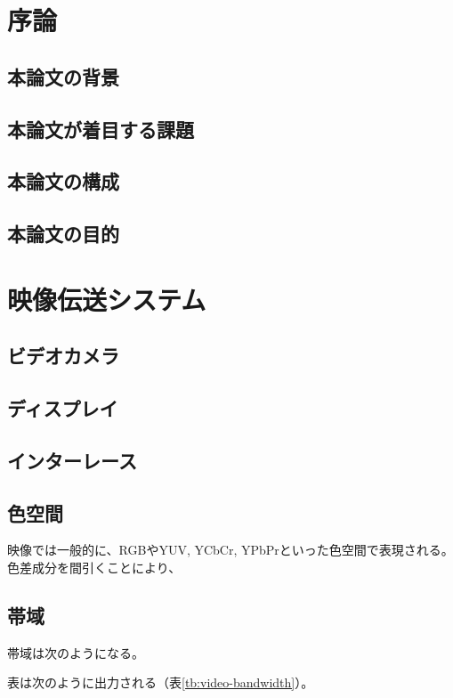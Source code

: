 \chapter{序論}
\label{chap:introduction}
\section{本論文の背景}
\section{本論文が着目する課題}
\section{本論文の構成}
\section{本論文の目的}

\chapter{映像伝送システム}
\label{chap:video-transmission}
\section{ビデオカメラ}
\section{ディスプレイ}
\section{インターレース}
\section{色空間}

映像では一般的に、RGBやYUV, YCbCr, YPbPrといった色空間で表現される。
色差成分を間引くことにより、

\section{帯域}

帯域は次のようになる。

表は次のように出力される（表\ref{tb:video-bandwidth}）。


